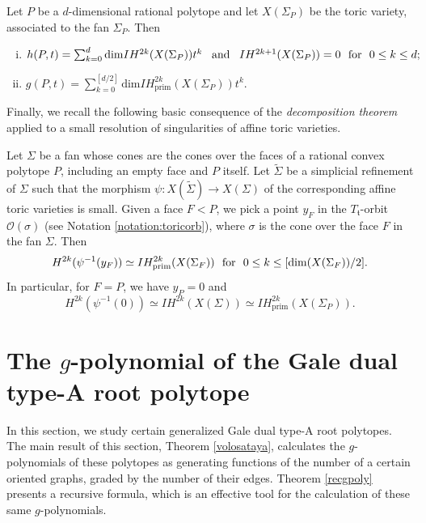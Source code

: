 \begin{theorem}\label{IChandg}
Let $P$ be a $d$-dimensional rational polytope and let $X(\Sigma_P)$ be the toric variety, associated to the fan $\Sigma_P$. Then 
\begin{enumerate}[(i)]
\item $h(P, t) = \sum_{k=0}^{d} \mathrm{dim}IH^{2k}(X(\Sigma_P))t^k \text{\,\,\, and \,\,\,}  IH^{2k+1}(X(\Sigma_P))=0  \text{\,\, for\,\, } 0\leq k \leq d;$
\item $g(P,t) = \sum_{k=0}^{[d/2]} 
\mathrm{dim}IH_{\mathrm{prim}}^{2k}(X(\Sigma_P))t^k.$
\end{enumerate}
\end{theorem}

Finally, we recall the following basic consequence of the \textit{decomposition 
theorem} \cite{BBD} applied to a small resolution of singularities of affine toric 
varieties.
\begin{theorem}\label{dec}
Let $\Sigma$ be a fan whose cones are the cones over the faces of a rational convex polytope $P$, including an empty face and $P$ itself. Let $\widetilde\Sigma$ be a simplicial refinement of $\Sigma$ such that the morphism $\psi: X(\widetilde\Sigma)\to X(\Sigma)$ of the corresponding  affine toric varieties is small. 
Given a face $F<P$, we pick a point $y_F$ in the 
 $T_\mathfrak{t}$-orbit 
 $\mathcal{O}(\sigma)$ (see Notation \ref{notation:toricorb}), where $ \sigma $ is the cone over the face $F$ in the fan 
 $\Sigma$. Then
$$H^{2k}(\psi^{-1}(y_F)) \simeq IH_{\mathrm{prim}}^{2k}(X(\Sigma_F)) \text{\,\, 
for\,\, }  0\leq k\leq [\mathrm{dim}(X(\Sigma_F))/2].$$
In particular, for $F=P$, we have $y_P=0$ and $$H^{2k}(\psi^{-1}(0)) \simeq 
IH^{2k}(X(\Sigma)) \simeq  IH_{\mathrm{prim}}^{2k}(X(\Sigma_P)).$$
\end{theorem}



\section{The \texorpdfstring{$g$}{g}-polynomial of the Gale dual type-A root polytope}\label{sec:zhepol}
In this section, we study certain generalized Gale dual type-A root polytopes. 
The 
main result of this section, Theorem \ref{volosataya}, calculates the 
$g$-polynomials of these polytopes as generating functions of the number of a 
certain oriented graphs, graded by the number of their edges. 
Theorem \ref{recgpoly} presents a recursive formula, which is an effective 
tool for the calculation of these same $g$-polynomials.  
